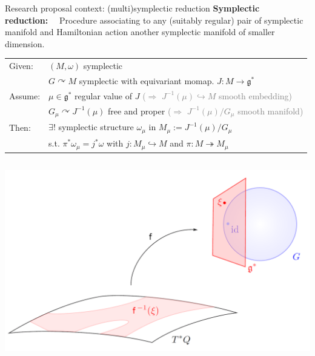 \documentclass[handout,10pt]{beamer}
\renewcommand{\action}{\curvearrowright}
\begin{document}
\begin{frame}{Research proposal context: (multi)symplectic reduction}
	\textbf{\color{UniGreen}Symplectic reduction:}~~
	Procedure associating to any (suitably regular) pair of symplectic manifold and Hamiltonian action another symplectic manifold of smaller dimension.
	\vfill
	\pause
	\begin{thmblock}
		\vspace{-.4em}
		\begin{tabular}{l p{12cm}}
		    Given: & $(M,\omega)$ symplectic
		    \\
		    & $G\curvearrowright M$ symplectic with equivariant momap. $J:M\to \mathfrak{g}^*$
		    \\[.2em]
		    Assume: & $\mu \in \mathfrak{g}^*$ regular value of $J$ 
		    \qquad\quad \footnotesize \textcolor{gray}{($\Rightarrow$ $J^{-1}(\mu)\hookrightarrow M$ smooth embedding)}
		    \\
			& $G_\mu\action J^{-1}(\mu)$ free and proper
			\quad \footnotesize \textcolor{gray}{($\Rightarrow$ $J^{-1}(\mu)/G_\mu$ smooth manifold)}
			\\[.4em]
			Then: & $\exists!$ symplectic structure $\omega_\mu$ in $M_\mu:= J^{-1}(\mu)/G_\mu$ \\
			& s.t. $\pi^\ast \omega_\mu = j^\ast \omega$ with $j:M_\mu \hookrightarrow M$ and $\pi:M\twoheadrightarrow M_\mu$
		\end{tabular}
		\vspace{-.4em}
	\end{thmblock}
	\vfill
	\pause
	\begin{columns}
		\begin{column}{0.40\textwidth}
			\includegraphics[width=\textwidth]{./Pictures/Reduction}
		\end{column}	
		

\end{columns}
\end{frame}
\end{document}
